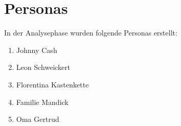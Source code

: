 \section{Personas}

In der Analysephase wurden folgende Personas erstellt:
\begin{enumerate}
\item Johnny Cash
\item Leon Schweickert
\item Florentina Kastenkette
\item Familie Mandick
\item Oma Gertrud
\end{enumerate}